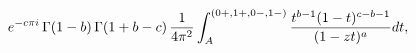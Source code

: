 \[e^{-c\pi i}\mathop{\Gamma\/}\nolimits\!\left(1-b\right)\mathop{\Gamma\/}%
\nolimits\!\left(1+b-c\right)\*\frac{1}{4\pi^{2}}\int_{A}^{(0+,1+,0-,1-)}\frac%
{t^{b-1}(1-t)^{c-b-1}}{(1-zt)^{a}}dt,\]
